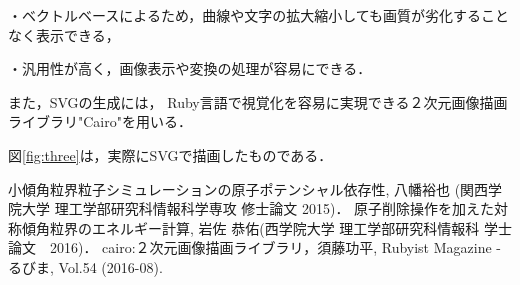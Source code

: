 \documentclass[a4j,twocolumn]{jsarticle}
\begin{document}
・ベクトルベースによるため，曲線や文字の拡大縮小しても画質が劣化することなく表示できる，

・汎用性が高く，画像表示や変換の処理が容易にできる．


また，SVGの生成には，
Ruby言語で視覚化を容易に実現できる２次元画像描画ライブラリ"Cairo"を用いる\cite{sudoh}．

図\ref{fig:three}は，実際にSVGで描画したものである．



\begin{thebibliography}{9}
 小傾角粒界粒子シミュレーションの原子ポテンシャル依存性, 八幡裕也 (関西学院大学 理工学部研究科情報科学専攻 修士論文 2015)．
 原子削除操作を加えた対称傾角粒界のエネルギー計算, 岩佐 恭佑(西学院大学 理工学部研究科情報科 学士論文　2016)． 
 cairo:２次元画像描画ライブラリ，須藤功平, Rubyist Magazine - るびま, Vol.54 (2016-08).
\end{thebibliography}
\end{document}
